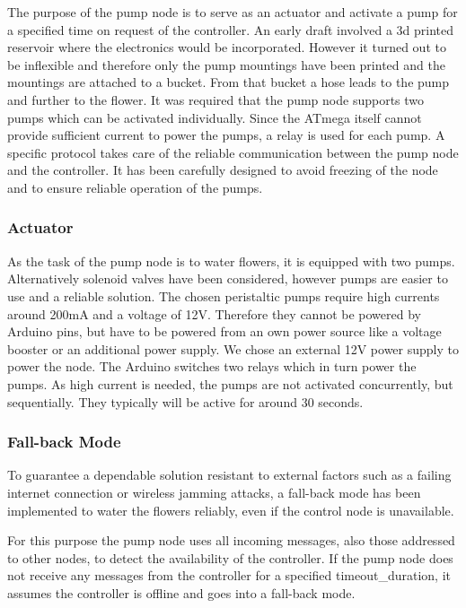 The purpose of the pump node is to serve as an actuator and activate a pump for a specified time on request of the controller. An early draft involved a 3d printed reservoir where the electronics would be incorporated. However it turned out to be inflexible and therefore only the pump mountings have been printed and the mountings are attached to a bucket. From that bucket a hose leads to the pump and further to the flower.
It was required that the pump node supports two pumps which can be activated individually. Since the ATmega itself cannot provide sufficient current to power the pumps, a relay is used for each pump. %
A specific protocol takes care of the reliable communication between the pump node and the controller. It has been carefully designed to avoid freezing of the node and to ensure reliable operation of the pumps.\\

\subsubsection{Actuator}
As the task of the pump node is to water flowers, it is equipped with two pumps. Alternatively solenoid valves have been considered, however pumps are easier to use and a reliable solution. The chosen peristaltic pumps require high currents around 200mA and a voltage of 12V. Therefore they cannot be powered by Arduino pins, but have to be powered from an own power source like a voltage booster or an additional power supply. We chose an external 12V power supply to power the node.
The Arduino switches two relays which in turn power the pumps. As high current is needed, the pumps are not activated concurrently, but sequentially. They typically will be active for around 30 seconds.


\subsubsection{Fall-back Mode}
To guarantee a dependable solution resistant to external factors such as a failing internet connection or wireless jamming attacks, a fall-back mode has been implemented to water the flowers reliably, even if the control node is unavailable.

For this purpose the pump node uses all incoming messages, also those addressed to other nodes, to detect the availability of the controller. If the pump node does not receive any messages from the controller for a specified timeout\_duration, it assumes the controller is offline and goes into a fall-back mode.

